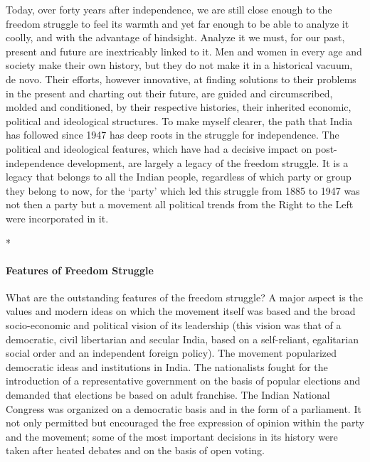 Today, over forty years after independence, we are still close enough to the freedom struggle to feel its warmth and yet far enough to be able to analyze it coolly, and with the advantage of hindsight. Analyze it we must, for our past, present and future are inextricably linked to it. Men and women in every age and society make their own history, but they do not make it in a historical vacuum, de novo. Their efforts, however innovative, at finding solutions to their problems in the present and charting out their future, are guided and circumscribed, molded and conditioned, by their respective histories, their inherited economic, political and ideological structures. To make myself clearer, the path that India has followed since 1947 has deep roots in the struggle for independence. The political and ideological features, which have had a decisive impact on post-independence development, are largely a legacy of the freedom struggle. It is a legacy that belongs to all the Indian people, regardless of which party or group they belong to now, for the `party' which led this struggle from 1885 to 1947 was not then a party but a movement all political trends from the Right to the Left were incorporated in it.

\begin{center}*\end{center}

\paragraph*{Features of Freedom Struggle}
What are the outstanding features of the freedom struggle? A major aspect is the values and modern ideas on which the movement itself was based and the broad socio-economic and political vision of its leadership (this vision was that of a democratic, civil libertarian and secular India, based on a self-reliant, egalitarian social order and an independent foreign policy). The movement popularized democratic ideas and institutions in India. The nationalists fought for the introduction of a representative government on the basis of popular elections and demanded that elections be based on adult franchise. The Indian National Congress was organized on a democratic basis and in the form of a parliament. It not only permitted but encouraged the free expression of opinion within the party and the movement; some of the most important decisions in its history were taken after heated debates and on the basis of open voting.

